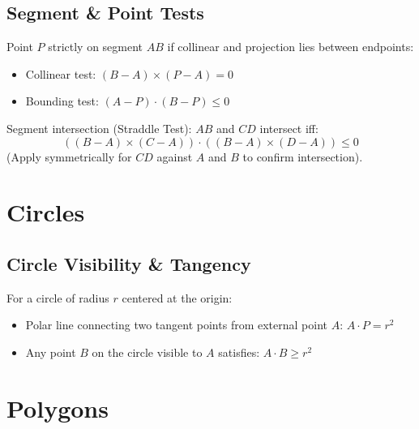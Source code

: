 	\subsection{Segment \& Point Tests}
		Point $P$ strictly on segment $AB$ if collinear and projection lies between endpoints:
		\begin{itemize}
			\item Collinear test: $(B-A) \times (P-A) = 0$
			\item Bounding test: $(A-P) \cdot (B-P) \le 0$
		\end{itemize}
		Segment intersection (Straddle Test): $AB$ and $CD$ intersect iff:
		\[ ((B-A) \times (C-A)) \cdot ((B-A) \times (D-A)) \le 0 \]
		(Apply symmetrically for $CD$ against $A$ and $B$ to confirm intersection).

\section{Circles}

	\par\vspace{5pt}
	\subsection{Circle Visibility \& Tangency}
		For a circle of radius $r$ centered at the origin:
		\begin{itemize}
			\item Polar line connecting two tangent points from external point $A$: $A \cdot P = r^2$
			\item Any point $B$ on the circle visible to $A$ satisfies: $A \cdot B \ge r^2$
		\end{itemize}

\section{Polygons}

